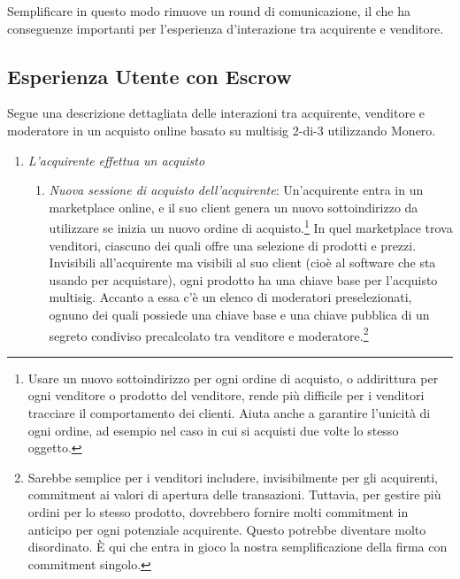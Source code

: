 Semplificare in questo modo rimuove un round di comunicazione, il che ha conseguenze importanti per l’esperienza d’interazione tra acquirente e venditore.


\subsection{Esperienza Utente con Escrow}
\label{subsec:escrowed-marketplace-escrow-user-experience}

Segue una descrizione dettagliata delle interazioni tra acquirente, venditore e moderatore in un acquisto online basato su multisig 2-di-3 utilizzando Monero.
\begin{enumerate}
    \item {\em L'acquirente effettua un acquisto}
    \begin{enumerate}
        \item {\em Nuova sessione di acquisto dell'acquirente}: Un'acquirente entra in un marketplace online, e il suo client genera un nuovo sottoindirizzo da utilizzare se inizia un nuovo ordine di acquisto.\footnote{Usare un nuovo sottoindirizzo per ogni ordine di acquisto, o addirittura per ogni venditore o prodotto del venditore, rende più difficile per i venditori tracciare il comportamento dei clienti. Aiuta anche a garantire l'unicità di ogni ordine, ad esempio nel caso in cui si acquisti due volte lo stesso oggetto.} In quel marketplace trova venditori, ciascuno dei quali offre una selezione di prodotti e prezzi. Invisibili all'acquirente ma visibili al suo client (cioè al software che sta usando per acquistare), ogni prodotto ha una chiave base per l'acquisto multisig. Accanto a essa c'è un elenco di moderatori preselezionati, ognuno dei quali possiede una chiave base e una chiave pubblica di un segreto condiviso precalcolato tra venditore e moderatore.\footnote{Sarebbe semplice per i venditori includere, invisibilmente per gli acquirenti, commitment ai valori di apertura delle transazioni. Tuttavia, per gestire più ordini per lo stesso prodotto, dovrebbero fornire molti commitment in anticipo per ogni potenziale acquirente. Questo potrebbe diventare molto disordinato. È qui che entra in gioco la nostra semplificazione della firma con commitment singolo.}

\end{enumerate}
\end{enumerate}
